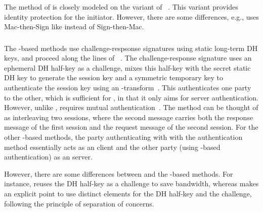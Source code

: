 \spacehack
\subsubsection{\mSigma{}}
\label{sec:sigma}
The \mSigSig{} method of \mEdhoc{} is closely modeled on the \mSigmaI{} variant of \mSigma{}~\cite{sigma}. This variant provides identity protection for the initiator. However, there are some differences, e.g., \mSigSig{} uses Mac-then-Sign like \mTls{} instead of Sign-then-Mac. 
%

\spacehack
\subsubsection{\mOptls{}}
\label{sec:optls}
The \mStat-based methods use challenge-respsonse signatures using static
long-term DH keys, and proceed along the lines of
\mOptls~\cite{DBLP:conf/eurosp/KrawczykW16}.
%
The challenge-response signature uses an ephemeral DH half-key as a challenge, mixes this half-key with the secret static DH key to generate the session key and a symmetric temporary key to authenticate the session key using an \mAead{}-transform~\cite{DBLP:conf/eurosp/KrawczykW16,aead}.
%
This authenticates one party to the other, which is sufficient for \mOptls, in that it only aims for server authentication.
%
%
However, unlike \mOptls{}, \mEdhoc{} requires mutual authentication~\cite{ietf-lake-reqs-04}. The \mStatStat{} method can be thought of as interleaving two \mOptls{} sessions, where the second \mEdhoc{} message carries both the response message of the first \mOptls{} session and the request message of the second \mOptls{} session. For the other \mStat{}-based methods, the party authenticating with with the \mStat{} authentication method essentially acts as an \mOptls{} client and the other party (using \mSig{}-based authentication) as an \mOptls{} server. 

%
%
However, there are some differences between \mOptls{} and the \mStat{}-based methods. For instance, \mEdhoc{} reuses the DH half-key as a challenge to save bandwidth, whereas \mOptls{} makes an explicit
point to use distinct elements for the DH half-key and the
challenge, following the principle of separation of concerns.
%

